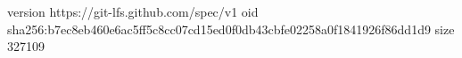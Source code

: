 version https://git-lfs.github.com/spec/v1
oid sha256:b7ec8eb460e6ac5ff5c8cc07cd15ed0f0db43cbfe02258a0f1841926f86dd1d9
size 327109
